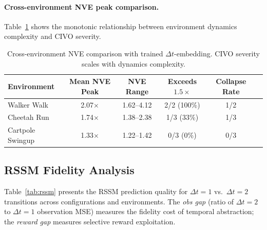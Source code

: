 \documentclass[10pt,letterpaper]{article}
\newcommand{\dt}{\Delta t}
\begin{document}
\paragraph{Cross-environment NVE peak comparison.}
Table~\ref{tab:cross_env_nve} shows the monotonic relationship between environment dynamics complexity and CIVO severity.

\begin{table}[h]
\centering
\caption{Cross-environment NVE comparison with trained $\dt$-embedding. CIVO severity scales with dynamics complexity.}
\label{tab:cross_env_nve}
\small
\begin{tabular}{lccccc}
\toprule
Environment & Mean NVE Peak & NVE Range & Exceeds $1.5\times$ & Collapse Rate \\
\midrule
Walker Walk      & 2.07$\times$ & 1.62--4.12 & 2/2 (100\%) & 1/2 \\
Cheetah Run      & 1.74$\times$ & 1.38--2.38 & 1/3 (33\%)  & 1/3 \\
Cartpole Swingup & 1.33$\times$ & 1.22--1.42 & 0/3 (0\%)   & 0/3 \\
\bottomrule
\end{tabular}
\end{table}

\subsection{RSSM Fidelity Analysis}
\label{sec:rssm}

Table~\ref{tab:rssm} presents the RSSM prediction quality for $\dt{=}1$ vs.\ $\dt{=}2$ transitions across configurations and environments.
The \emph{obs gap} (ratio of $\dt{=}2$ to $\dt{=}1$ observation MSE) measures the fidelity cost of temporal abstraction; the \emph{reward gap} measures selective reward exploitation.
\end{document}
